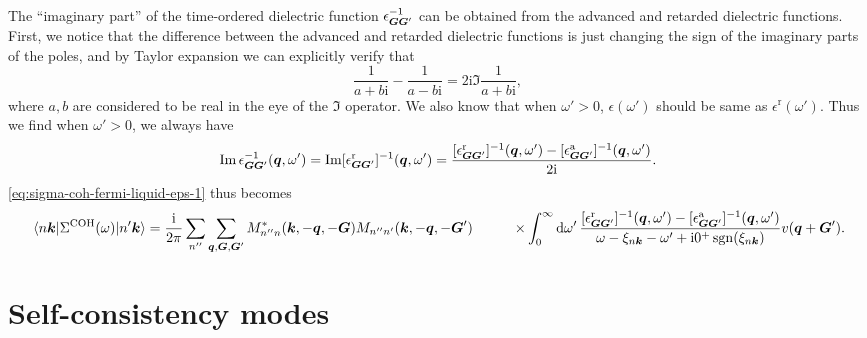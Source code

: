 \documentclass[hyperref, a4paper, 12pt]{report}
\DeclareMathOperator{\sgn}{sgn}
\newcommand*{\ii}{\mathrm{i}}
\def\\{}%
\begin{document}
The ``imaginary part'' of the time-ordered dielectric function $\epsilon_{\vb*{G} \vb*{G}'}^{-1}$
can be obtained from the advanced and retarded dielectric functions.
First, we notice that the difference between the advanced and retarded dielectric functions 
is just changing the sign of the imaginary parts of the poles, 
and by Taylor expansion we can explicitly verify that 
\[
    \frac{1}{a + b \ii}  - \frac{1}{a - b \ii}
    = 2 \ii \Im \frac{1}{a + b \ii}, 
\]
where $a, b$ are considered to be real in the eye of the $\Im$ operator.
We also know that when $\omega' > 0$, 
$\epsilon(\omega')$ should be same as $\epsilon^{\text{r}}(\omega')$.
Thus we find when $\omega' > 0$, 
we always have 
\begin{equation}
    \Im \epsilon^{-1}_{\vb*{G} \vb*{G}'}(\vb*{q}, \omega')
    = \Im [\epsilon^{\text{r}}_{\vb*{G} \vb*{G}'}]^{-1}(\vb*{q}, \omega')
    = \frac{[\epsilon^{\text{r}}_{\vb*{G} \vb*{G}'}]^{-1}(\vb*{q}, \omega') - 
    [\epsilon^{\text{a}}_{\vb*{G} \vb*{G}'}]^{-1}(\vb*{q}, \omega')}{2\ii}  .
\end{equation}
\eqref{eq:sigma-coh-fermi-liquid-eps-1} thus becomes 
\begin{equation}
    \begin{aligned}
        \mel{n \vb*{k}}{\Sigma^{\text{COH}}(\omega)}{n' \vb*{k}}
        &= \frac{\ii}{2\pi} \sum_{n''} \sum_{\vb*{q}, \vb*{G}, \vb*{G}'}
        M^*_{n'' n} (\vb*{k}, - \vb*{q}, - \vb*{G})  M_{n'' n'} (\vb*{k}, - \vb*{q},  -\vb*{G}') \\
        &\quad \quad \times \int_{0}^{\infty} \dd{\omega'} 
        \frac{
            [\epsilon^{\text{r}}_{\vb*{G} \vb*{G}'}]^{-1} (\vb*{q}, \omega')
            - [\epsilon^{\text{a}}_{\vb*{G} \vb*{G}'}]^{-1} (\vb*{q}, \omega') 
        }{\omega - \xi_{n \vb*{k}} - \omega' + \ii 0^+ \sgn(\xi_{n \vb*{k}})} v(\vb*{q}+\vb*{G}') .
    \end{aligned}
    \label{eq:ch-sum-final}
\end{equation}

\section{Self-consistency modes}
\end{document}
